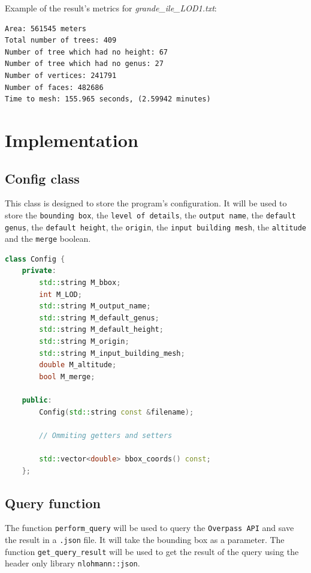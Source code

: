 \documentclass[12pt]{article}
\begin{document}
Example of the result's metrics for \textit{grande\_ile\_LOD1.txt}:

\begin{lstlisting}
Area: 561545 meters
Total number of trees: 409
Number of tree which had no height: 67
Number of tree which had no genus: 27
Number of vertices: 241791
Number of faces: 482686
Time to mesh: 155.965 seconds, (2.59942 minutes)
\end{lstlisting}

\newpage

\section{Implementation}

\subsection{Config class}

This class is designed to store the program's configuration. It will be used to
store the \texttt{bounding box}, the \texttt{level of details}, the
\texttt{output name}, the \texttt{default genus}, the \texttt{default height},
the \texttt{origin}, the \texttt{input building mesh}, the \texttt{altitude} and 
the \texttt{merge} boolean.

\begin{lstlisting}[language=C++]
class Config {
    private:
        std::string M_bbox;
        int M_LOD;
        std::string M_output_name;
        std::string M_default_genus;
        std::string M_default_height;
        std::string M_origin;
        std::string M_input_building_mesh;
        double M_altitude;
        bool M_merge;

    public:
        Config(std::string const &filename);

        // Ommiting getters and setters

        std::vector<double> bbox_coords() const;
    };

\end{lstlisting}

\subsection{Query function}

The function \texttt{perform\_query} will be used to query the \texttt{Overpass API}
and save the result in a \texttt{.json} file. It will take the bounding box as a
parameter.
The function \texttt{get\_query\_result} will be used to get the result of the query
using the header only library \texttt{nlohmann::json}.
\end{document}
